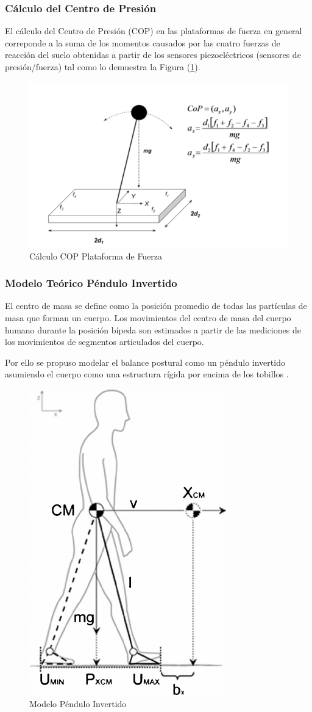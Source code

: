 \documentclass[12pt,a4paper]{article}
\begin{document}
\subsubsection{Cálculo del Centro de Presión}
El cálculo del Centro de Presión (COP) en las plataformas de fuerza en general correponde a la suma de los momentos causados por las cuatro fuerzas de reacción del suelo obtenidas a partir de los sensores piezoeléctricos (sensores de presión/fuerza) tal como lo demuestra la Figura (\ref{fig:calculoCOP}).

\begin{figure}[H]
	\centering
	\includegraphics[width=0.65\linewidth]{images/calculoCOP}
	\caption{Cálculo COP Plataforma de Fuerza}
	\label{fig:calculoCOP}
\end{figure}

\subsubsection{Modelo Teórico Péndulo Invertido}

El centro de masa se define como la posición promedio de todas las partículas de masa que forman un cuerpo.
Los movimientos del centro de masa del cuerpo humano durante la posición bípeda son estimados a partir de las mediciones de los movimientos de segmentos articulados del cuerpo.

Por ello se propuso modelar el balance postural como un péndulo invertido asumiendo el cuerpo como una estructura rígida por encima de los tobillos \cite{gage_kinematic_2004}.

\begin{figure}[H]
	\centering
	\label{inverted-pendulum}
	\includegraphics[width=0.4\linewidth]{images/inverted-pendulum}
	\caption{Modelo Péndulo Invertido}
\end{figure}
\end{document}
